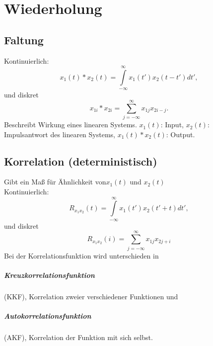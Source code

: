 \chapter{Wiederholung}

\section{Faltung}
Kontinuierlich: 
\begin{equation}
x_1(t) \ast x_2(t)= \int\limits_{-\infty}^{\infty} x_1(t')x_2(t-t')dt',
\end{equation}
und diskret
\begin{equation}
x_{1i} \ast x_{2i} = \sum\limits_{j=-\infty}^{\infty} x_{1j} x_{2i-j}.
\end{equation}
Beschreibt Wirkung eines linearen Systems. $x_1(t)$: Input, $x_2(t)$: Impulsantwort des linearen Systems, $x_1(t) \ast x_2(t)$: Output.


\section{Korrelation (deterministisch)}
Gibt ein Maß für Ähnlichkeit von$ x_1(t)$ und $x_2(t)$\\
Kontinuierlich:
\begin{equation}
R_{x_1x_2}(t)= \int\limits_{-\infty}^{\infty} x_1(t')x_2(t'+t)dt',
\end{equation}
und diskret
\begin{equation}
R_{x_1x_2}(i) = \sum\limits_{j=-\infty}^{\infty} x_{1j} x_{2j+i}
\end{equation}
Bei der Korrelationsfunktion wird unterschieden in
\paragraph*{Kreuzkorrelationsfunktion} (KKF), Korrelation zweier verschiedener Funktionen und
\paragraph*{Autokorrelationsfunktion} (AKF), Korrelation der Funktion mit sich selbst.

